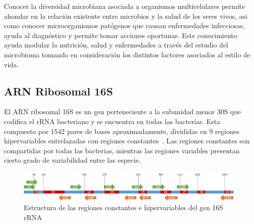 Conocer la diversidad microbiana asociada a organismos multicelulares permite ahondar en la relación existente entre microbios y la salud de los seres vivos, asi como conocer microorganismos patógenos que causan enfermedades infecciosas, ayuda al diagnóstico y permite tomar acciones oportunas. Este conocimiento ayuda modular la nutrición, salud y enfermedades a través del estudio del microbioma tomando en consideración los distintos factores asociados al estilo de vida.
\subsection{ARN Ribosomal 16S}
El ARN ribosomal 16S es un gen perteneciente a la subunidad menor 30S que codifica el rRNA bacteriano y se encuentra en todas las bacterías. 
Esta compuesto por 1542 pares de bases aproximadamente, divididas en 9 regiones hipervariables entrelazadas con regiones constantes~\cite{clarridge2004impact}.
Las regiones constantes son compartidas por todas las bacterias, mientras las regiones variables presentan cierto grado de variabilidad entre las especie. 



\begin{figure}[H]
    \centering
    \includegraphics[width=1\linewidth]{images/16S.png}
    \caption{Estructura de las regiones constantes e hipervariables del gen 16S rRNA}
    \label{fig:16S_structure}
\end{figure}

